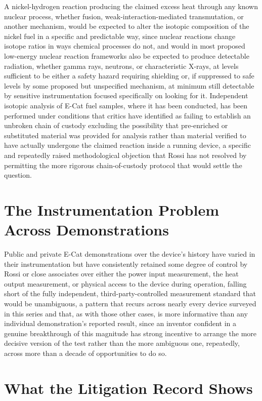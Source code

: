 \documentclass[11pt]{article}
\begin{document}
A nickel-hydrogen reaction producing the claimed excess heat through any known nuclear process, whether fusion, weak-interaction-mediated transmutation, or another mechanism, would be expected to alter the isotopic composition of the nickel fuel in a specific and predictable way, since nuclear reactions change isotope ratios in ways chemical processes do not, and would in most proposed low-energy nuclear reaction frameworks also be expected to produce detectable radiation, whether gamma rays, neutrons, or characteristic X-rays, at levels sufficient to be either a safety hazard requiring shielding or, if suppressed to safe levels by some proposed but unspecified mechanism, at minimum still detectable by sensitive instrumentation focused specifically on looking for it. Independent isotopic analysis of E-Cat fuel samples, where it has been conducted, has been performed under conditions that critics have identified as failing to establish an unbroken chain of custody excluding the possibility that pre-enriched or substituted material was provided for analysis rather than material verified to have actually undergone the claimed reaction inside a running device, a specific and repeatedly raised methodological objection that Rossi has not resolved by permitting the more rigorous chain-of-custody protocol that would settle the question.

\section{The Instrumentation Problem Across Demonstrations}

Public and private E-Cat demonstrations over the device's history have varied in their instrumentation but have consistently retained some degree of control by Rossi or close associates over either the power input measurement, the heat output measurement, or physical access to the device during operation, falling short of the fully independent, third-party-controlled measurement standard that would be unambiguous, a pattern that recurs across nearly every device surveyed in this series and that, as with those other cases, is more informative than any individual demonstration's reported result, since an inventor confident in a genuine breakthrough of this magnitude has strong incentive to arrange the more decisive version of the test rather than the more ambiguous one, repeatedly, across more than a decade of opportunities to do so.

\section{What the Litigation Record Shows}
\end{document}
